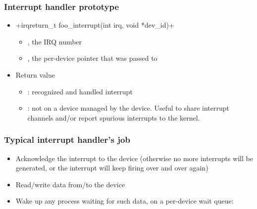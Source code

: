 \begin{frame}[fragile]
  \frametitle{Interrupt handler prototype}
  \begin{itemize}
  \item {}+irqreturn_t foo_interrupt(int irq, void *dev_id)+
    \begin{itemize}
    \item {}, the IRQ number
    \item {}, the per-device pointer that was
      passed to 
    \end{itemize}
  \item Return value
    \begin{itemize}
    \item {}: recognized and handled interrupt
    \item {}: not on a device managed by the
      device. Useful to share interrupt channels and/or report
      spurious interrupts to the kernel.
    \end{itemize}
  \end{itemize}
\end{frame}

\begin{frame}
  \frametitle{Typical interrupt handler's job}
  \begin{itemize}
  \item Acknowledge the interrupt to the device (otherwise no more
    interrupts will be generated, or the interrupt will keep firing
    over and over again)
  \item Read/write data from/to the device
  \item Wake up any process waiting for such data, on a per-device
    wait queue:\\
\end{itemize}
\end{frame}

